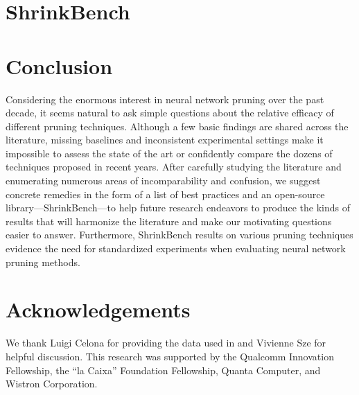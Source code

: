 \section{ShrinkBench} \label{sec:bench}

% 



\vspace{-1mm}
\section{Conclusion}

Considering the enormous interest in neural network pruning over the past decade, it seems natural to ask simple questions about the relative efficacy of different pruning techniques.
Although a few basic findings are shared across the literature, missing baselines and inconsistent experimental settings make it impossible to assess the state of the art or confidently compare the dozens of techniques proposed in recent years.
After carefully studying the literature and enumerating numerous areas of incomparability and confusion, we suggest concrete remedies in the form of a list of best practices and an open-source library---ShrinkBench---to help future research endeavors to produce the kinds of results that will harmonize the literature and make our motivating questions easier to answer. Furthermore, ShrinkBench results on various pruning techniques evidence the need for standardized experiments when evaluating neural network pruning methods.

\section*{Acknowledgements}

We thank Luigi Celona for providing the data used in \cite{luigi} and Vivienne Sze for helpful discussion. This research was supported by the Qualcomm Innovation Fellowship, the ``la Caixa'' Foundation Fellowship, Quanta Computer, and Wistron Corporation.


